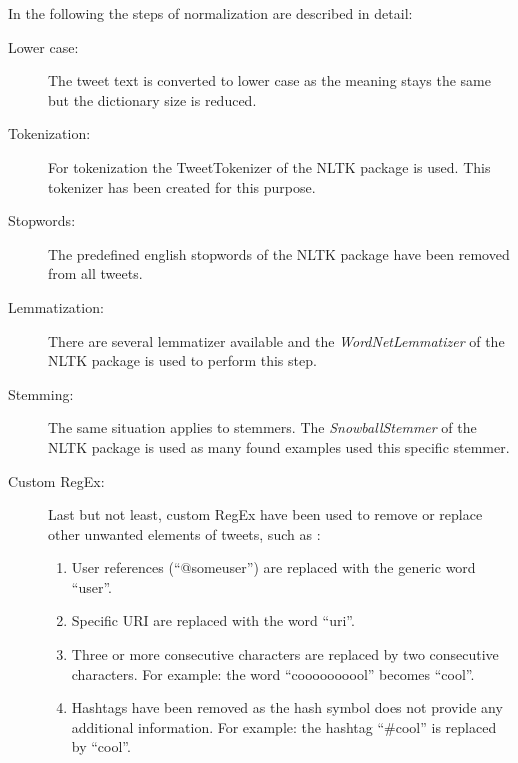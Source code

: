 In the following the steps of normalization are described in detail:

\begin{description}

  \item [Lower case:]
    The tweet text is converted to lower case as the meaning stays the same but the dictionary size is reduced.

  \item [Tokenization:]
    For tokenization the TweetTokenizer of the NLTK package is used.
    This tokenizer has been created for this purpose.

  \item [Stopwords:]
    The predefined english stopwords of the NLTK package have been removed from all tweets.
  
  \item [Lemmatization:]
    There are several lemmatizer available and the \emph{WordNetLemmatizer} of the NLTK package is used to perform this step.

  \item [Stemming:]
    The same situation applies to stemmers.
    The \emph{SnowballStemmer} of the NLTK package is used as many found examples used this specific stemmer.

  \item [Custom \ac{RegEx}:]
    Last but not least, custom \ac{RegEx} have been used to remove or replace other unwanted elements of tweets, such as \cite{Pagolu2016a}:

    \begin{enumerate}
      \item User references (``@someuser'') are replaced with the generic word ``user''.
      \item Specific URI are replaced with the word ``uri''.
      \item Three or more consecutive characters are replaced by two consecutive characters.
        For example: the word ``coooooooool'' becomes ``cool''.
      \item Hashtags have been removed as the hash symbol does not provide any additional information. 
        For example: the hashtag ``\#cool'' is replaced by ``cool''.
    \end{enumerate}

\end{description}

